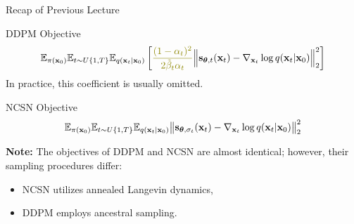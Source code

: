 \documentclass{beamer}
\begin{document}
\begin{frame}
\titlepage
	\resetonslide
\end{frame}
\begin{frame}{Recap of Previous Lecture}
	\begin{block}{DDPM Objective}
		\vspace{-0.5cm}
		\[
			\bbE_{\pi(\bx_0)} \bbE_{t \sim U\{1, T\}}\bbE_{q(\bx_t | \bx_0)} \left[ {\color{olive}\frac{(1 - \alpha_t)^2}{2\tilde{\beta}_t \alpha_t}} \Bigl\|  \bs_{\btheta, t} (\bx_t) - \nabla_{\bx_t} \log q(\bx_t | \bx_0) \Bigr\|_2^2  \right]
		\]
		In practice, {\color{olive}this coefficient} is usually omitted.
	\end{block}
	\begin{block}{NCSN Objective}
		\vspace{-0.3cm}
		\[
			\mathbb{E}_{\pi(\mathbf{x}_0)} \mathbb{E}_{t \sim U\{1, T\}} \mathbb{E}_{q(\mathbf{x}_t | \mathbf{x}_0)}\bigl\| \mathbf{s}_{\boldsymbol{\theta}, \sigma_t}(\mathbf{x}_t) - \nabla_{\mathbf{x}_t} \log q(\mathbf{x}_t | \mathbf{x}_0) \bigr\|^2_2 
		\]
		\vspace{-0.3cm}
	\end{block}
	\textbf{Note:} The objectives of DDPM and NCSN are almost identical; however, their sampling procedures differ:
	\begin{itemize}
		\item NCSN utilizes annealed Langevin dynamics,
		\item DDPM employs ancestral sampling.
	\end{itemize}
\end{frame}
\end{document}
